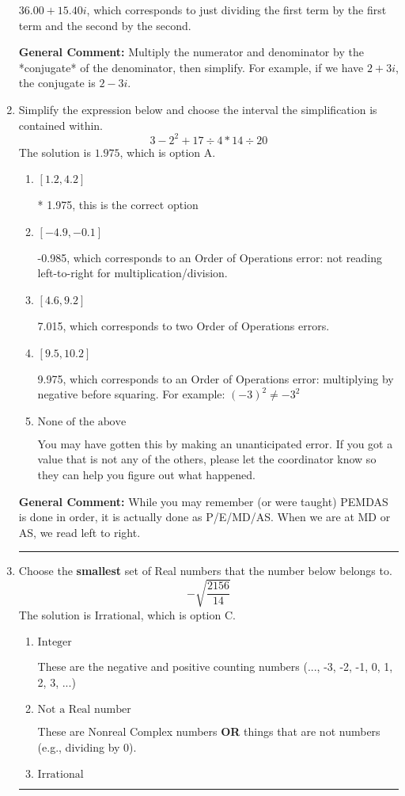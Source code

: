 \documentclass{extbook}[14pt]
\newcommand{\litem}[1]{\item #1

\rule{\textwidth}{0.4pt}}
\begin{document}
\begin{enumerate}
{\begin{enumerate}[label=\Alph*.]
 $36.00  + 15.40 i$, which corresponds to just dividing the first term by the first term and the second by the second.
\end{enumerate}

\textbf{General Comment:} Multiply the numerator and denominator by the *conjugate* of the denominator, then simplify. For example, if we have $2+3i$, the conjugate is $2-3i$.
}
\litem{
Simplify the expression below and choose the interval the simplification is contained within.
\[ 3 - 2^2 + 17 \div 4 * 14 \div 20 \]The solution is \( 1.975 \), which is option A.\begin{enumerate}[label=\Alph*.]
\item \( [1.2, 4.2] \)

* 1.975, this is the correct option
\item \( [-4.9, -0.1] \)

 -0.985, which corresponds to an Order of Operations error: not reading left-to-right for multiplication/division.
\item \( [4.6, 9.2] \)

 7.015, which corresponds to two Order of Operations errors.
\item \( [9.5, 10.2] \)

 9.975, which corresponds to an Order of Operations error: multiplying by negative before squaring. For example: $(-3)^2 \neq -3^2$
\item \( \text{None of the above} \)

 You may have gotten this by making an unanticipated error. If you got a value that is not any of the others, please let the coordinator know so they can help you figure out what happened.
\end{enumerate}

\textbf{General Comment:} While you may remember (or were taught) PEMDAS is done in order, it is actually done as P/E/MD/AS. When we are at MD or AS, we read left to right.
}
\litem{
Choose the \textbf{smallest} set of Real numbers that the number below belongs to.
\[ -\sqrt{\frac{2156}{14}} \]The solution is \( \text{Irrational} \), which is option C.\begin{enumerate}[label=\Alph*.]
\item \( \text{Integer} \)

These are the negative and positive counting numbers (..., -3, -2, -1, 0, 1, 2, 3, ...)
\item \( \text{Not a Real number} \)

These are Nonreal Complex numbers \textbf{OR} things that are not numbers (e.g., dividing by 0).
\item \( \text{Irrational} \)


\end{enumerate}}
\end{enumerate}
\end{document}
